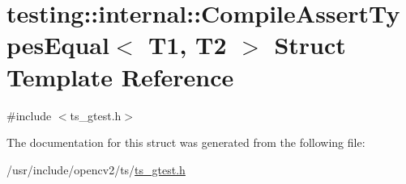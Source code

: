 \hypertarget{structtesting_1_1internal_1_1CompileAssertTypesEqual}{\section{testing\-:\-:internal\-:\-:Compile\-Assert\-Types\-Equal$<$ T1, T2 $>$ Struct Template Reference}
\label{structtesting_1_1internal_1_1CompileAssertTypesEqual}
}


{\ttfamily \#include $<$ts\-\_\-gtest.\-h$>$}



The documentation for this struct was generated from the following file\-:\begin{DoxyCompactItemize}
\item 
/usr/include/opencv2/ts/\hyperlink{ts__gtest_8h}{ts\-\_\-gtest.\-h}\end{DoxyCompactItemize}
